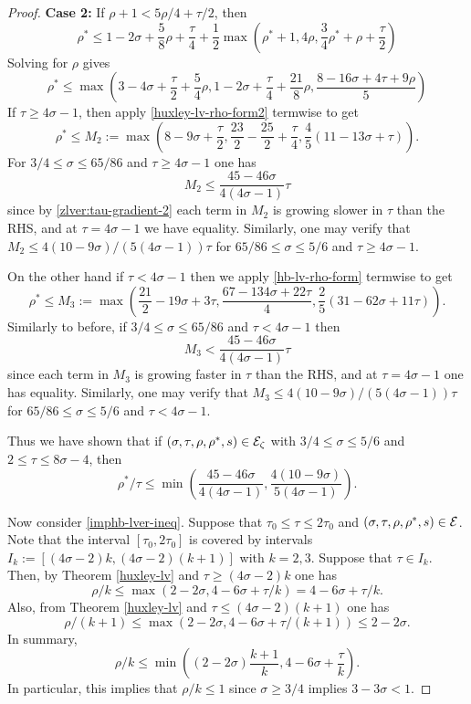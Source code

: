 \begin{proof}
\textbf{Case 2:} If $\rho + 1 < 5\rho/4 + \tau/2$, then
\[
\rho^* \le 1 - 2\sigma + \frac{5}{8}\rho + \frac{\tau}{4} + \frac{1}{2}\max(\rho^* + 1, 4\rho, \frac{3}{4}\rho^*+\rho +\frac{\tau}{2})
\]
Solving for $\rho$ gives
\[
\rho^* \le \max(3 - 4\sigma + \frac{\tau}{2} + \frac{5}{4}\rho, 1 - 2\sigma + \frac{\tau}{4} + \frac{21}{8}\rho, \frac{8 - 16\sigma + 4\tau + 9\rho}{5})
\]
If $\tau \ge 4\sigma - 1$, then apply \eqref{huxley-lv-rho-form2} termwise to get
\[
\rho^* \le M_2 := \max(8 - 9\sigma + \frac{\tau}{2}, \frac{23}{2} - \frac{25}{2} + \frac{\tau}{4}, \frac{4}{5}(11 - 13 \sigma + \tau)).
\]
For $3/4 \le \sigma \le 65/86$ and $\tau \ge 4\sigma - 1$ one has
\[
M_2 \le \frac{45 - 46\sigma}{4(4\sigma - 1)}\tau
\]
since by \eqref{zlver:tau-gradient-2} each term in $M_2$ is growing slower in $\tau$ than the RHS, and at $\tau = 4\sigma - 1$ we have equality. Similarly, one may verify that $M_2 \le 4(10 - 9\sigma)/(5(4\sigma - 1))\tau$ for $65/86 \le \sigma \le 5/6$ and $\tau \ge 4\sigma - 1$.

On the other hand if $\tau < 4\sigma - 1$ then we apply \eqref{hb-lv-rho-form} termwise to get
\[
\rho^* \le M_3 := \max(\frac{21}{2} - 19\sigma + 3\tau, \frac{67 -134\sigma + 22\tau}{4}, \frac{2}{5}(31 - 62\sigma + 11\tau)).
\]
Similarly to before, if $3/4 \le \sigma \le 65/86$ and $\tau < 4\sigma - 1$ then
\[
M_3 < \frac{45 - 46\sigma}{4(4\sigma - 1)}\tau
\]
since each term in $M_3$ is growing faster in $\tau$ than the RHS, and at $\tau = 4\sigma - 1$ one has equality. Similarly, one may verify that $M_3 \le 4(10 - 9\sigma)/(5(4\sigma - 1))\tau$ for $65/86 \le \sigma \le 5/6$ and $\tau < 4\sigma - 1$.

Thus we have shown that if $(\sigma, \tau, \rho, \rho^*, s) \in \mathcal{E}_\zeta$ with $3/4 \le \sigma \le 5/6$ and $2 \le \tau \le 8\sigma - 4$, then
\[
\rho^*/\tau \le \min\left(\frac{45 - 46\sigma}{4(4\sigma - 1)}, \frac{4(10 - 9\sigma)}{5(4\sigma - 1)}\right).
\]

Now consider \eqref{imphb-lver-ineq}. Suppose that $\tau_0 \le \tau \le 2\tau_0$ and $(\sigma, \tau, \rho, \rho^*, s) \in \mathcal{E}$. Note that the interval $[\tau_0, 2\tau_0]$ is covered by intervals $I_k := [(4\sigma - 2)k, (4\sigma - 2)(k + 1)]$ with $k = 2, 3$. Suppose that $\tau \in I_k$. Then, by Theorem \ref{huxley-lv} and $\tau \ge (4\sigma - 2)k$ one has
\[
\rho/k \le \max(2 - 2\sigma, 4 - 6\sigma + \tau/k) = 4 - 6\sigma + \tau/k.
\]
Also, from Theorem \ref{huxley-lv} and $\tau \le (4\sigma - 2)(k + 1)$ one has
\[
\rho/(k + 1) \le \max(2 - 2\sigma, 4 - 6\sigma + \tau/(k + 1)) \le 2 - 2\sigma.
\]
In summary,
\begin{equation}\label{ze-ihb-rho-bound-k}
\rho/k \le \min((2 - 2\sigma)\frac{k + 1}{k}, 4 - 6\sigma + \frac{\tau}{k}).
\end{equation}
In particular, this implies that $\rho/k \le 1$ since $\sigma \ge 3/4$ implies $3 - 3\sigma < 1$.


\end{proof}
